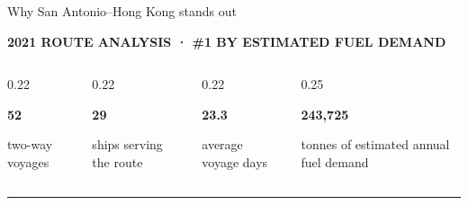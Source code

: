 \documentclass[aspectratio=169,11pt]{beamer}
\newcommand{\partlabel}[1]{%
  {\color{Navy}\fontsize{9}{11}\selectfont\bfseries\MakeUppercase{#1}\par}
}
\begin{document}
\begin{frame}{Why San Antonio--Hong Kong stands out}
  \vspace{0.08cm}
  \partlabel{2021 route analysis · \#1 by estimated fuel demand}

  \vspace{0.3cm}
  \begin{columns}[T,onlytextwidth]
    \begin{column}{0.22\textwidth}
      {\color{Navy}\fontsize{25}{28}\selectfont\bfseries 52\par}
      \vspace{0.05cm}
      {\color{Muted}\fontsize{9.5}{12}\selectfont
        two-way voyages
      \par}
    \end{column}

    \begin{column}{0.22\textwidth}
      {\color{Navy}\fontsize{25}{28}\selectfont\bfseries 29\par}
      \vspace{0.05cm}
      {\color{Muted}\fontsize{9.5}{12}\selectfont
        ships serving the route
      \par}
    \end{column}

    \begin{column}{0.22\textwidth}
      {\color{Navy}\fontsize{25}{28}\selectfont\bfseries 23.3\par}
      \vspace{0.05cm}
      {\color{Muted}\fontsize{9.5}{12}\selectfont
        average voyage days
      \par}
    \end{column}

    \begin{column}{0.25\textwidth}
      {\color{Navy}\fontsize{22}{25}\selectfont\bfseries 243,725\par}
      \vspace{0.05cm}
      {\color{Muted}\fontsize{9.5}{12}\selectfont
        tonnes of estimated annual fuel demand
      \par}
    \end{column}
  \end{columns}

  \vspace{0.42cm}
  {\color{RuleGray}\rule{\textwidth}{0.5pt}\par}


\end{frame}
\end{document}
